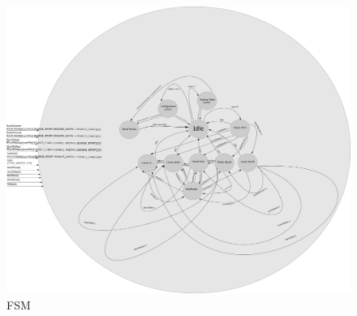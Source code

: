 \begin{figure}
    \includegraphics[width=\textwidth]{Figures/fsm.pdf}
    \caption{FSM} 
    \label{figure:fsm}
\end{figure}


